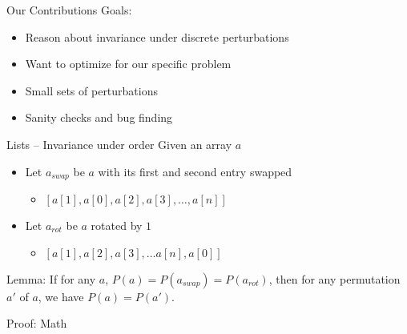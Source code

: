 \documentclass[usenames,dvipsnames]{beamer}
\begin{document}
\begin{frame}[fragile]{Our Contributions}
    Goals:
    \begin{itemize}
        \item<2-> Reason about invariance under discrete perturbations
        \item<3-> Want to optimize for our specific problem
    \end{itemize}
        \vfill
    \begin{itemize}
        \item<5-> Small sets of perturbations 
        \item<6-> Sanity checks and bug finding
    \end{itemize}
\end{frame}

\begin{frame}[fragile]{Lists -- Invariance under order}
  Given an array $a$
  \begin{itemize}
    \item Let $a_{swap}$ be $a$ with its first and second entry swapped
    \begin{itemize}
      \item $[ a[1], a[0], a[2], a[3], \ldots, a[n] ]$
    \end{itemize}
    \item Let $a_{rot}$ be $a$ rotated by $1$
    \begin{itemize}
      \item $[ a[1], a[2], a[3], \ldots  a[n], a[0] ]$
    \end{itemize}
  \end{itemize}
  \vfill
  Lemma: If for any $a$, $P(a) = P(a_{swap}) = P(a_{rot})$,
  then for any permutation $a'$ of $a$,
  we have $P(a) = P(a')$. \cite{dummitfoote}

  Proof: Math
\end{frame}
\end{document}
